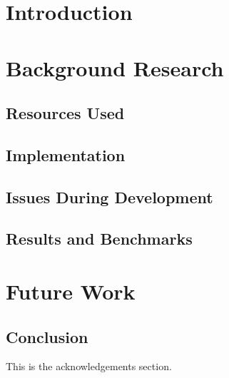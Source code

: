 \section{Introduction}


\section{Background Research} 


\subsection{Resources Used}


\subsection{Implementation}


\subsection{Issues During Development}


\subsection{Results and Benchmarks}



\section{Future Work}



\subsection{Conclusion}


\begin{acks}
This is the acknowledgements section.
\end{acks}
